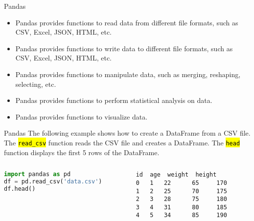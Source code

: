 \documentclass[
    aspectratio=169, 
    usepdftitle=false, 
    xcolor={dvipsnames},
    hyperref={
        colorlinks,
        linkcolor=black,
        urlcolor=blue}
    ]{beamer}
\let\OldTexttt\texttt
\renewcommand{\texttt}[1]{\OldTexttt{\hl{#1}}}%
\begin{document}
\begin{frame}{Pandas}
    \begin{itemize}
        \item Pandas provides functions to read data from different file formats, such as CSV, Excel, JSON, HTML, etc.
        \item Pandas provides functions to write data to different file formats, such as CSV, Excel, JSON, HTML, etc.
        \item Pandas provides functions to manipulate data, such as merging, reshaping, selecting, etc.
        \item Pandas provides functions to perform statistical analysis on data.
        \item Pandas provides functions to visualize data.
    \end{itemize}
\end{frame}

\begin{frame}[fragile]{Pandas}
    The following example shows how to create a DataFrame from a CSV file. The \texttt{read\_csv} function reads the CSV file and creates a DataFrame. The \texttt{head} function displays the first 5 rows of the DataFrame.

    \begin{columns}
        \begin{column}{0.45\textwidth}
\begin{lstlisting}[language=Python]
import pandas as pd
df = pd.read_csv('data.csv')
df.head()
\end{lstlisting}
\end{column}
\begin{column}{0.45\textwidth}
\begin{lstlisting}[style=output]
   id  age  weight  height
0   1   22      65     170
1   2   25      70     175
2   3   28      75     180
3   4   31      80     185
4   5   34      85     190
\end{lstlisting}
\end{column}
\end{columns}
\end{frame}
\end{document}

